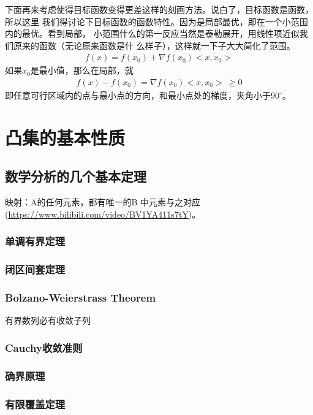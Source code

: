 \documentclass[UTF8]{ctexbook}
\begin{document}
下面再来考虑使得目标函数变得更差这样的刻画方法。说白了，目标函数是函数，所以这里
我们得讨论下目标函数的函数特性。因为是局部最优，即在一个小范围内的最优。看到局部，
小范围什么的第一反应当然是泰勒展开，用线性项近似我们原来的函数（无论原来函数是什
么样子），这样就一下子大大简化了范围。
\begin{align}
  f(x) = f( x_0 ) + \nabla f( x_0 )  <x, x_0  >
\end{align}
如果$x_0$是最小值，那么在局部，就
\begin{align}
  f(x) - f( x_0 ) = \nabla f( x_0 ) < x, x_0 > \  \ge 0
\end{align}
即任意可行区域内的点与最小点的方向，和最小点处的梯度，夹角小于$90^{ \circ }$。

\section{凸集的基本性质}

\subsection{数学分析的几个基本定理}
映射：A的任何元素，都有唯一的B 中元素与之对应(\url{https://www.bilibili.com/video/BV1YA411s7tY})。

\subsubsection{单调有界定理}

\subsubsection{闭区间套定理}

\subsubsection{Bolzano-Weierstrass Theorem}
有界数列必有收敛子列

\subsubsection{Cauchy收敛准则}


\subsubsection{确界原理}

 
\subsubsection{有限覆盖定理}
\end{document}
